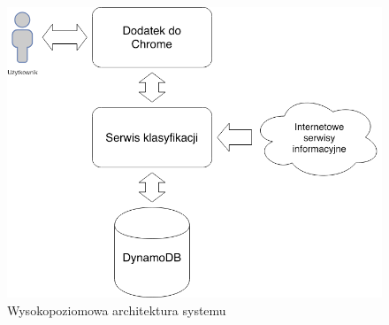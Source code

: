 \begin{enumerate}
    \begin{figure}[H]
    \centering
    \includegraphics[width=12cm]{images/implementacja/architecture.png}
    \caption{Wysokopoziomowa architektura systemu}
    \label{fig:architecture}
    \end{figure}
    
\end{enumerate}